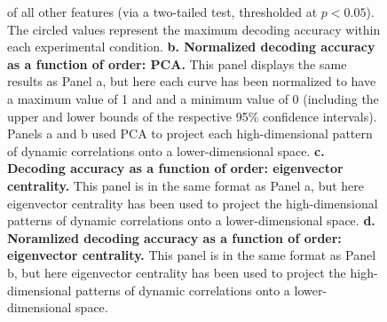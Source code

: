 \documentclass[english]{article}
\begin{document}
\begin{figure}[hp]
{    of all other features (via a two-tailed test, thresholded at
    $p < 0.05$).  The circled values represent the maximum decoding
    accuracy within each experimental condition.
    \textbf{b. Normalized decoding accuracy as a function of order:
      PCA.}  This panel displays the same results as Panel a, but here
    each curve has been normalized to have a maximum value of 1 and
    and a minimum value of 0 (including the upper and lower bounds of
    the respective 95\% confidence intervals).  Panels a and b used
    PCA to project each high-dimensional pattern of dynamic
    correlations onto a lower-dimensional space.  \textbf{c.  Decoding
      accuracy as a function of order: eigenvector centrality.} This
    panel is in the same format as Panel a, but here eigenvector
    centrality has been used to project the high-dimensional patterns
    of dynamic correlations onto a lower-dimensional space.
    \textbf{d. Noramlized decoding accuracy as a function of order:
      eigenvector centrality.} This panel is in the same format as
    Panel b, but here eigenvector centrality has been used to project
    the high-dimensional patterns of dynamic correlations onto a
    lower-dimensional space.}
  \label{fig:decoding}
\end{figure}
\end{document}
